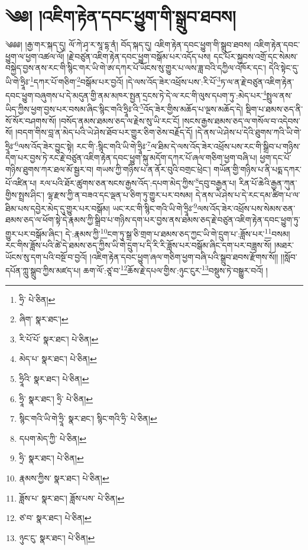 \setcounter{footnote}{0} 
\chapter{༄༅། །འཇིག་རྟེན་དབང་ཕྱུག་གི་སྒྲུབ་ཐབས།}༄༅༅། །རྒྱ་གར་སྐད་དུ། ལོ་ཀེ་ཤྭ་ར་སཱ་དྷ་ནཾ། བོད་སྐད་དུ། འཇིག་རྟེན་དབང་ཕྱུག་གི་སྒྲུབ་ཐབས། འཇིག་རྟེན་དབང་ཕྱུག་ལ་ཕྱག་འཚལ་ལོ། །རྗེ་བཙུན་འཇིག་རྟེན་དབང་ཕྱུག་བསྒོམ་པར་འདོད་པས། དང་པོར་སྐྱབས་འགྲོ་དང་སེམས་བསྐྱེད་བྱས་ནས་རང་གི་སྙིང་གར་ཡི་གེ་ཨ་དཀར་པོ་ཡོངས་སུ་གྱུར་པ་ལས་ཟླ་བའི་དཀྱིལ་འཁོར་དང་། དེའི་སྟེང་དུ་ཡི་གེ་ཧྲཱིཿ་\footnote{ཧྲི་  པེ་ཅིན། }དཀར་པོ་གཅིག་\footnote{ཞིག་  སྣར་ཐང་། }བསྒོམ་པར་བྱའོ། །དེ་ལས་འོད་ཟེར་འཕྲོས་པས་:རི་པོ་\footnote{རི་པོ་པོ་  སྣར་ཐང་།  པེ་ཅིན། }ཏ་ལ་ན་རྗེ་བཙུན་འཇིག་རྟེན་དབང་ཕྱུག་བཞུགས་པ་དེ་མདུན་གྱི་ནམ་མཁར་སྤྱན་དྲངས་ཏེ་དེ་ལ་རང་གི་ལུས་དཔག་ཏུ་:མེད་པར་\footnote{མེད་པ་  སྣར་ཐང་།  པེ་ཅིན། }སྤྲུལ་ནས་ཡིད་ཀྱིས་ཕྱག་བྱས་པར་བསམ་ཞིང་སྙིང་གའི་ཧྲཱིཿ་འི་\footnote{ཧྲཱིའི་  སྣར་ཐང་།  པེ་ཅིན། }འོད་ཟེར་གྱིས་མཆོད་པ་ལྔས་མཆོད་དེ། སྡིག་པ་ཐམས་ཅད་ནི་སོ་སོར་བཤགས་སོ། །བསོད་ནམས་ཐམས་ཅད་ལ་རྗེས་སུ་ཡི་རང་ངོ། །སངས་རྒྱས་ཐམས་ཅད་ལ་གསོལ་བ་འདེབས་སོ། །བདག་གིས་བླ་ན་མེད་པའི་ཡེ་ཤེས་ཐོབ་པར་གྱུར་ཅིག་ཅེས་བརྗོད་དོ། །དེ་ནས་ཡེ་ཤེས་པ་དེའི་ཐུགས་ཀའི་ཡི་གེ་ཧྲཱིཿ་\footnote{ཧྲཱི་  སྣར་ཐང་། ཧྲི་  པེ་ཅིན། }ལས་འོད་ཟེར་བྱུང་སྟེ། རང་གི་:སྙིང་གའི་ཡི་གེ་ཧྲཱིཿ་\footnote{སྙིང་གའི་ཡི་གེ་ཧྲཱི་  སྣར་ཐང་། སྙིང་གའི་ཧྲི་  པེ་ཅིན། }ལ་ཐིམ་དེ་ལས་འོད་ཟེར་འཕྲོས་པས་རང་གི་སྒྲིབ་པ་གཉིས་དག་པར་བྱས་ཏེ་རང་རྗེ་བཙུན་འཇིག་རྟེན་དབང་ཕྱུག་སྐུ་མདོག་དཀར་པོ་ཞལ་གཅིག་ཕྱག་བཞི་པ། ཕྱག་དང་པོ་གཉིས་ཐུགས་ཀར་ཐལ་མོ་སྦྱར་བ། གཡས་ཀྱི་གཉིས་པ་ན་ནོར་བུའི་བགྲང་ཕྲེང་། གཡོན་གྱི་གཉིས་པ་ནི་པདྨ་དཀར་པོ་འཛིན་པ། རལ་པའི་ཐོར་ཚུགས་ཅན་སངས་རྒྱས་འོད་:དཔག་མེད་ཀྱིས་\footnote{དཔག་མེད་ཀྱི་  པེ་ཅིན། }དབུ་བརྒྱན་པ། རིན་པོ་ཆེའི་རྒྱན་ཀུན་གྱིས་སྤྲས་ཤིང་། ལྷ་རྫས་ཀྱི་ན་བཟའ་དང་ལྡན་པ་ཅིག་ཏུ་གྱུར་པར་བསམ། དེ་ནས་ཡེ་ཤེས་པ་དེ་རང་དམ་ཚིག་པ་ལ་ཐིམ་པས་དབྱེར་མེད་དུ་གྱུར་པར་བསྒོམ། ཡང་རང་གི་སྙིང་གའི་ཡི་གེ་ཧྲཱིཿ་\footnote{ཧྲི་  སྣར་ཐང་།  པེ་ཅིན། }ལས་འོད་ཟེར་འཕྲོས་པས་སེམས་ཅན་ཐམས་ཅད་ལ་ཕོག་སྟེ་དེ་རྣམས་ཀྱི་སྒྲིབ་པ་གཉིས་དག་པར་བྱས་ནས་ཐམས་ཅད་རྗེ་བཙུན་འཇིག་རྟེན་དབང་ཕྱུག་ཏུ་གྱུར་པར་བསྒོམ་ཞིང་། དེ་:རྣམས་ཀྱི་\footnote{རྣམས་ཀྱིས་  སྣར་ཐང་།  པེ་ཅིན། }ངག་ཏུ་སྒྲ་ཅི་གྲག་པ་ཐམས་ཅད་ཀྱང་ཡི་གེ་དྲུག་པ་:ཟློས་པར་\footnote{ཟློས་པ་  སྣར་ཐང་། ཟློས་པས་  པེ་ཅིན། }བསམ། རང་གིས་ཟློས་པའི་ཚེ་དེ་ཐམས་ཅད་ཀྱིས་ཡི་གེ་དྲུག་པ་དི་རི་རི་ཟློས་པར་བསྒོམ་ཞིང་དག་པར་བཟླས་སོ། །མཐར་ཡོངས་སུ་དག་པའི་བསྔོ་བ་བྱའོ། །འཇིག་རྟེན་དབང་ཕྱུག་ཞལ་གཅིག་ཕྱག་བཞི་པའི་སྒྲུབ་ཐབས་རྫོགས་སོ།། །།སློབ་དཔོན་ཀླུ་སྒྲུབ་ཀྱིས་མཛད་པ། ཆག་ལོ་:ཙཱ་བ་\footnote{ཙ་བ་  སྣར་ཐང་།  པེ་ཅིན། }ཆོས་རྗེ་དཔལ་གྱིས་:ཉུང་ངུར་\footnote{ཉུང་ངུ་  སྣར་ཐང་།  པེ་ཅིན། }བསྡུས་ཏེ་བསྒྱུར་བའོ། ། 